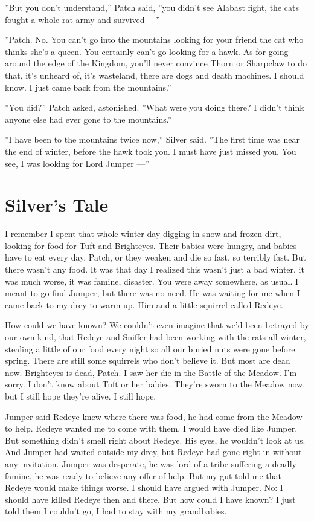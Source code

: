 \documentclass[12pt]{book}
\begin{document}
''But you don't understand,'' Patch said, ''you didn't see Alabast
fight, the cats fought a whole rat army and survived ---''

''Patch. No. You can't go into the mountains looking for your friend
the cat who thinks she's a queen. You certainly can't go looking for a
hawk. As for going around the edge of the Kingdom, you'll never
convince Thorn or Sharpclaw to do that, it's unheard of, it's
wasteland, there are dogs and death machines. I should know. I just
came back from the mountains.''

''You did?'' Patch asked, astonished. ''What were you doing there? I
didn't think anyone else had ever gone to the mountains.''

''I have been to the mountains twice now,'' Silver said. ''The first
time was near the end of winter, before the hawk took you. I must have
just missed you. You see, I was looking for Lord Jumper ---''


\section{Silver's Tale}

I remember I spent that whole winter day digging in snow and frozen
dirt, looking for food for Tuft and Brighteyes. Their babies were
hungry, and babies have to eat every day, Patch, or they weaken and
die so fast, so terribly fast. But there wasn't any food. It was that
day I realized this wasn't just a bad winter, it was much worse, it
was famine, disaster. You were away somewhere, as usual. I meant to go
find Jumper, but there was no need. He was waiting for me when I came
back to my drey to warm up. Him and a little squirrel called Redeye.

How could we have known? We couldn't even imagine that we'd been
betrayed by our own kind, that Redeye and Sniffer had been working
with the rats all winter, stealing a little of our food every night so
all our buried nuts were gone before spring. There are still some
squirrels who don't believe it. But most are dead now. Brighteyes is
dead, Patch. I saw her die in the Battle of the Meadow. I'm sorry. I
don't know about Tuft or her babies. They're sworn to the Meadow now,
but I still hope they're alive. I still hope.

Jumper said Redeye knew where there was food, he had come from the
Meadow to help. Redeye wanted me to come with them. I would have died
like Jumper. But something didn't smell right about Redeye. His eyes,
he wouldn't look at us. And Jumper had waited outside my drey, but
Redeye had gone right in without any invitation. Jumper was desperate,
he was lord of a tribe suffering a deadly famine, he was ready to
believe any offer of help. But my gut told me that Redeye would make
things worse. I should have argued with Jumper. No: I should have
killed Redeye then and there. But how could I have known? I just told
them I couldn't go, I had to stay with my grandbabies.
\end{document}
